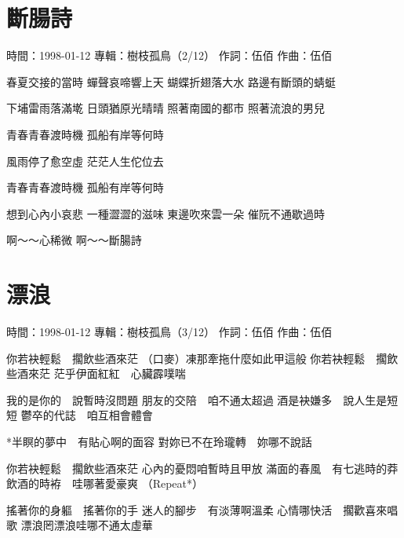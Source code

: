 \documentclass[UTF8,a4paper,oneside,twocolumn,12pt]{ctexbook}
\newcommand{\infopair}[2]{\textbullet #1：#2}
\newcommand{\zc}[1][伍佰]{\infopair{作詞}{#1}}
\newcommand{\zq}[1][伍佰]{\infopair{作曲}{#1}}
\newcommand{\zj}[1]{\infopair{專輯}{#1}}
\newcommand{\sj}[1]{\infopair{時間}{#1}}
\newenvironment{info}{\begin{flushleft}\kaishu
	}
	{\end{flushleft}\normalsize\yahei\par}
\newenvironment{lyric}{
	}
{}
\begin{document}
\section{斷腸詩}
\begin{info}
	\sj{1998-01-12}
	\zj{樹枝孤鳥（2/12）}
	\zc
	\zq
\end{info}
\begin{lyric}
	春夏交接的當時
	蟬聲哀啼響上天
	蝴蝶折翅落大水
	路邊有斷頭的蜻蜓

	下埔雷雨落滿墘
	日頭猶原光晴晴
	照著南國的都市
	照著流浪的男兒

	青春青春渡時機
	孤船有岸等何時

	風雨停了愈空虛
	茫茫人生佗位去

	青春青春渡時機
	孤船有岸等何時

	想到心內小哀悲
	一種澀澀的滋味
	東邊吹來雲一朵
	催阮不通歇過時

	啊～～心稀微
	啊～～斷腸詩
\end{lyric}

\section{漂浪}
\begin{info}
	\sj{1998-01-12}
	\zj{樹枝孤鳥（3/12）}
	\zc
	\zq
\end{info}
\begin{lyric}
	你若袂輕鬆　擱飲些酒來茫
	（口麥）凍那牽拖什麼如此甲這般
	你若袂輕鬆　擱飲些酒來茫
	茫乎伊面紅紅　心臟霹噗喘

	我的是你的　說暫時沒問題
	朋友的交陪　咱不通太超過
	酒是袂嫌多　說人生是短短
	鬱卒的代誌　咱互相會體會

	*半瞑的夢中　有貼心啊的面容
	對妳已不在玲瓏轉　妳哪不說話

	你若袂輕鬆　擱飲些酒來茫
	心內的憂悶咱暫時且甲放
	滿面的春風　有七逃時的莽
	飲酒的時袸　哇哪著愛豪爽
	（Repeat*）

	搖著你的身軀　搖著你的手
	迷人的腳步　有淡薄啊溫柔
	心情哪快活　擱歡喜來唱歌
	漂浪罔漂浪哇哪不通太虛華
\end{lyric}
\end{document}
